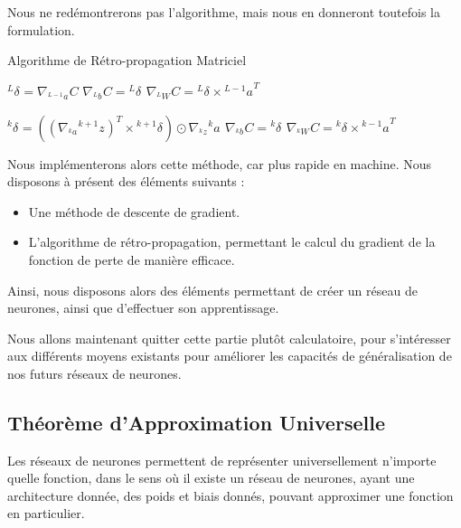 \documentclass[a4paper, 10pt]{report}
\newcommand{\lexp}[1]{\phantom{}^{#1}}
\newcommand{\elem}[4]{\lexp{#2}#1^{#3}_{#4}}
\begin{document}
Nous ne redémontrerons pas l'algorithme, mais nous en donneront toutefois la formulation.
\begin{algorithm}[H]
	\caption{Algorithme de Rétro-propagation Matriciel}
	\begin{algorithmic}
		\STATE
		\STATE $\elem{\delta}{L}{}{} = \nabla_{\elem{a}{L-1}{}{}} C$
		\STATE $\nabla_{\elem{b}{L}{}{}} C = \elem{\delta}{L}{}{}$
		\STATE $\nabla_{\elem{W}{L}{}{}} C = \elem{\delta}{L}{}{} \times{\elem{a}{L-1}{}{}}^T $
					    
		\STATE
		\STATE $\elem{\delta}{k}{}{} = ((\nabla_{\elem{a}{k}{}{}}\elem{z}{k+1}{}{})^T \times \elem{\delta}{k+1}{}{}) \odot \nabla_{\elem{z}{k}{}{}}{\elem{a}{k}{}{}}$
		\STATE $\nabla_{\elem{b}{k}{}{}} C = \elem{\delta}{k}{}{}$
		\STATE $\nabla_{\elem{W}{k}{}{}} C = \elem{\delta}{k}{}{} \times{\elem{a}{k-1}{}{}}^T $
		\ENDFOR
	\end{algorithmic}
\end{algorithm}
Nous implémenterons alors cette méthode, car plus rapide en machine.
Nous disposons à présent des éléments suivants :
\begin{itemize}
	\item Une méthode de descente de gradient.
	\item L'algorithme de rétro-propagation, permettant le calcul du gradient de la fonction de perte de manière efficace.
\end{itemize}
Ainsi, nous disposons alors des éléments permettant de créer un réseau de neurones, ainsi que d'effectuer son apprentissage.

Nous allons maintenant quitter cette partie plutôt calculatoire, pour s'intéresser aux différents moyens existants pour améliorer les capacités de généralisation de nos futurs réseaux de neurones.
\subsection{Théorème d'Approximation Universelle}
Les réseaux de neurones permettent de représenter universellement n'importe quelle fonction, dans le sens où il existe un réseau de neurones, ayant une architecture donnée, des poids et biais donnés, pouvant approximer une fonction en particulier.
\end{document}
